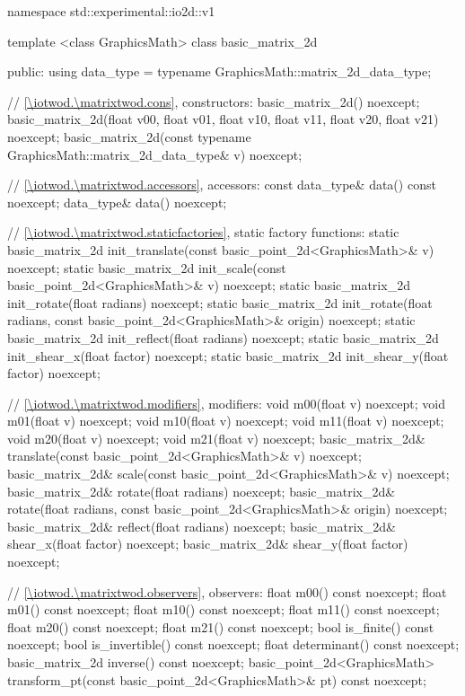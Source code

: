 \begin{codeblock}
namespace std::experimental::io2d::v1 {
  template <class GraphicsMath>
  class basic_matrix_2d {
  public:
    using data_type = typename GraphicsMath::matrix_2d_data_type;
    
    // \ref{\iotwod.\matrixtwod.cons}, constructors:
    basic_matrix_2d() noexcept;
    basic_matrix_2d(float v00, float v01, float v10, float v11, float v20, float v21) noexcept;
    basic_matrix_2d(const typename GraphicsMath::matrix_2d_data_type& v) noexcept;

    // \ref{\iotwod.\matrixtwod.accessors}, accessors:
    const data_type& data() const noexcept;
    data_type& data() noexcept;

    // \ref{\iotwod.\matrixtwod.staticfactories}, static factory functions:
    static basic_matrix_2d init_translate(const basic_point_2d<GraphicsMath>& v) noexcept;
    static basic_matrix_2d init_scale(const basic_point_2d<GraphicsMath>& v) noexcept;
    static basic_matrix_2d init_rotate(float radians) noexcept;
    static basic_matrix_2d init_rotate(float radians,
      const basic_point_2d<GraphicsMath>& origin) noexcept;
    static basic_matrix_2d init_reflect(float radians) noexcept;
    static basic_matrix_2d init_shear_x(float factor) noexcept;
    static basic_matrix_2d init_shear_y(float factor) noexcept;

    // \ref{\iotwod.\matrixtwod.modifiers}, modifiers:
    void m00(float v) noexcept;
    void m01(float v) noexcept;
    void m10(float v) noexcept;
    void m11(float v) noexcept;
    void m20(float v) noexcept;
    void m21(float v) noexcept;
    basic_matrix_2d& translate(const basic_point_2d<GraphicsMath>& v) noexcept;
    basic_matrix_2d& scale(const basic_point_2d<GraphicsMath>& v) noexcept;
    basic_matrix_2d& rotate(float radians) noexcept;
    basic_matrix_2d& rotate(float radians, const basic_point_2d<GraphicsMath>& origin) noexcept;
    basic_matrix_2d& reflect(float radians) noexcept;
    basic_matrix_2d& shear_x(float factor) noexcept;
    basic_matrix_2d& shear_y(float factor) noexcept;

    // \ref{\iotwod.\matrixtwod.observers}, observers:
    float m00() const noexcept;
    float m01() const noexcept;
    float m10() const noexcept;
    float m11() const noexcept;
    float m20() const noexcept;
    float m21() const noexcept;
    bool is_finite() const noexcept;
    bool is_invertible() const noexcept;
    float determinant() const noexcept;
    basic_matrix_2d inverse() const noexcept;
    basic_point_2d<GraphicsMath> transform_pt(const basic_point_2d<GraphicsMath>& pt)
      const noexcept;

}}
\end{codeblock}
